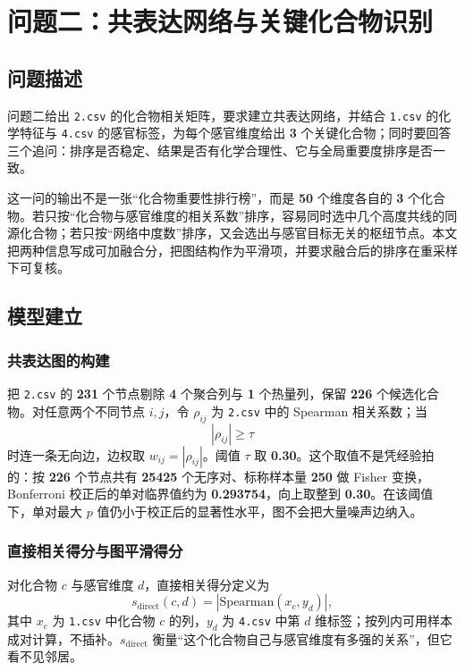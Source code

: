 \section{问题二：共表达网络与关键化合物识别}

\subsection{问题描述}

问题二给出 \texttt{2.csv} 的化合物相关矩阵，要求建立共表达网络，并结合 \texttt{1.csv} 的化学特征与 \texttt{4.csv} 的感官标签，为每个感官维度给出 \textbf{3} 个关键化合物；同时要回答三个追问：排序是否稳定、结果是否有化学合理性、它与全局重要度排序是否一致。

这一问的输出不是一张“化合物重要性排行榜”，而是 \textbf{50} 个维度各自的 \textbf{3} 个化合物。若只按“化合物与感官维度的相关系数”排序，容易同时选中几个高度共线的同源化合物；若只按“网络中度数”排序，又会选出与感官目标无关的枢纽节点。本文把两种信息写成可加融合分，把图结构作为平滑项，并要求融合后的排序在重采样下可复核。

\subsection{模型建立}

\subsubsection{共表达图的构建}

把 \texttt{2.csv} 的 \textbf{231} 个节点剔除 \textbf{4} 个聚合列与 \textbf{1} 个热量列，保留 \textbf{226} 个候选化合物。对任意两个不同节点 $i,j$，令 $\rho_{ij}$ 为 \texttt{2.csv} 中的 Spearman 相关系数；当
\begin{equation}
\left|\rho_{ij}\right|\ge \tau
\label{eq:edge}
\end{equation}
时连一条无向边，边权取 $w_{ij}=|\rho_{ij}|$。阈值 $\tau$ 取 \textbf{0.30}。这个取值不是凭经验拍的：按 \textbf{226} 个节点共有 \textbf{25425} 个无序对、标称样本量 \textbf{250} 做 Fisher 变换，Bonferroni 校正后的单对临界值约为 \textbf{0.293754}，向上取整到 \textbf{0.30}\cite{benjamini1995}。在该阈值下，单对最大 $p$ 值仍小于校正后的显著性水平，图不会把大量噪声边纳入。

\subsubsection{直接相关得分与图平滑得分}

对化合物 $c$ 与感官维度 $d$，直接相关得分定义为
\begin{equation}
s_{\mathrm{direct}}(c,d)=\left|\mathrm{Spearman}\left(x_c,y_d\right)\right|,
\label{eq:sdirect}
\end{equation}
其中 $x_c$ 为 \texttt{1.csv} 中化合物 $c$ 的列，$y_d$ 为 \texttt{4.csv} 中第 $d$ 维标签；按列内可用样本成对计算，不插补。$s_{\mathrm{direct}}$ 衡量“这个化合物自己与感官维度有多强的关系”，但它看不见邻居。

